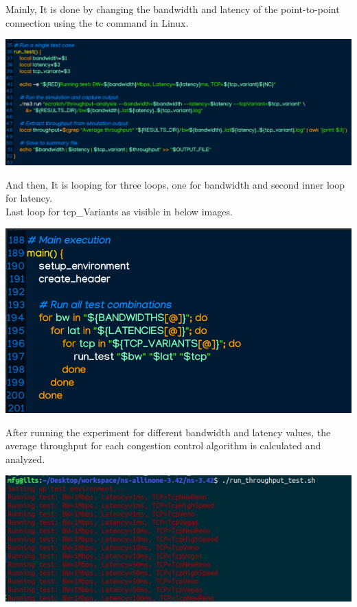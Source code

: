 \documentclass[11pt,a4paper]{article}
\begin{document}
Mainly, It is done by changing the bandwidth and latency of the point-to-point connection using the tc command in Linux.\\
\begin{center}
    \includegraphics[width=1\columnwidth]{images/latency-sh.jpg}
\end{center}
And then, It is looping for three loops, one for bandwidth and second inner loop for latency.\\
Last loop for tcp\_Variants as visible in below images.\\
\begin{center}
    \includegraphics[width=1\columnwidth]{images/flow-latency.jpg}
\end{center}

After running the experiment for different bandwidth and latency values, the average throughput for each congestion control algorithm is calculated and analyzed.\\
\begin{center}
    \includegraphics[width=1\columnwidth]{images/simulation.jpg}
\end{center}
\end{document}
